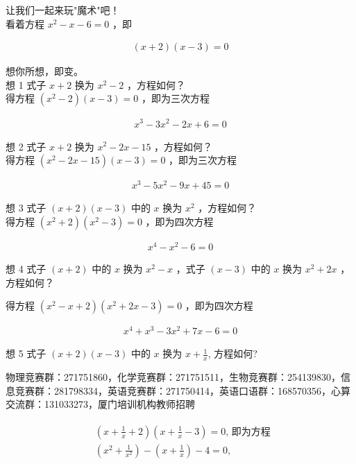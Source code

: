 \documentclass[10pt]{article}
\begin{document}
让我们一起来玩"魔术"吧！\\
看着方程 $x^{2}-x-6=0$ ，即

\begin{align*}
(x+2)(x-3)=0
\end{align*}

想你所想，即变。\\
想 1 式子 $x+2$ 换为 $x^{2}-2$ ，方程如何？\\
得方程 $\left(x^{2}-2\right)(x-3)=0$ ，即为三次方程

\begin{align*}
x^{3}-3 x^{2}-2 x+6=0 \tag{1}
\end{align*}

想 2 式子 $x+2$ 换为 $x^{2}-2 x-15$ ，方程如何？\\
得方程 $\left(x^{2}-2 x-15\right)(x-3)=0$ ，即为三次方程

\begin{align*}
x^{3}-5 x^{2}-9 x+45=0 \tag{2}
\end{align*}

想 3 式子 $(x+2)(x-3)$ 中的 $x$ 换为 $x^{2}$ ，方程如何？\\
得方程 $\left(x^{2}+2\right)\left(x^{2}-3\right)=0$ ，即为四次方程

\begin{align*}
x^{4}-x^{2}-6=0 \tag{3}
\end{align*}

想 4 式子 $(x+2)$ 中的 $x$ 换为 $x^{2}-x$ ，式子 $(x-3)$ 中的 $x$ 换为 $x^{2}+2 x$ ，方程如何？

得方程 $\left(x^{2}-x+2\right)\left(x^{2}+2 x-3\right)=0$ ，即为四次方程

\begin{align*}
x^{4}+x^{3}-3 x^{2}+7 x-6=0 \tag{4}
\end{align*}

想 5 式子 $(x+2)(x-3)$ 中的 $x$ 换为 $x+\frac{1}{x}$, 方程如何?

物理竞赛群：271751860，化学竞赛群：271751511，生物竞赛群：254139830，信息竞赛群：281798334，英语竞赛群：271750414，英语口语群：168570356，心算交流群：131033273，厦门培训机构教师招聘

\begin{align*}
\begin{aligned}
&\left(x+\frac{1}{x}+2\right)\left(x+\frac{1}{x}-3\right)=0 \text {, 即为方程 } \\
&\left(x^{2}+\frac{1}{x^{2}}\right)-\left(x+\frac{1}{x}\right)-4=0,
\end{aligned}
\end{align*}
\end{document}
